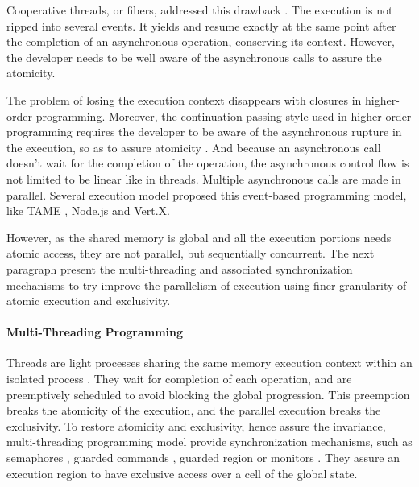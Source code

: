 Cooperative threads, or fibers, addressed this drawback \cite{Adya2002,Behren2003a}.
The execution is not ripped into several events.
It yields and resume exactly at the same point after the completion of an asynchronous operation, conserving its context.
However, the developer needs to be well aware of the asynchronous calls to assure the atomicity.

The problem of losing the execution context disappears with closures in higher-order programming.
Moreover, the continuation passing style used in higher-order programming requires the developer to be aware of the asynchronous rupture in the execution, so as to assure atomicity \cite{Sussman1998}.
And because an asynchronous call doesn't wait for the completion of the operation, the asynchronous control flow is not limited to be linear like in threads.
Multiple asynchronous calls are made in parallel.
Several execution model proposed this event-based programming model, like TAME \cite{Krohn2007}, Node.js and Vert.X.

However, as the shared memory is global and all the execution portions needs atomic access, they are not parallel, but sequentially concurrent.
The next paragraph present the multi-threading and associated synchronization mechanisms to try improve the parallelism of execution using finer granularity of atomic execution and exclusivity.

\paragraph{Multi-Threading Programming}

Threads are light processes sharing the same memory execution context within an isolated process \cite{Dijkstra1968}.
They wait for completion of each operation, and are preemptively scheduled to avoid blocking the global progression.
This preemption breaks the atomicity of the execution, and the parallel execution breaks the exclusivity.
To restore atomicity and exclusivity, hence assure the invariance, multi-threading programming model provide synchronization mechanisms, such as semaphores \cite{Dijkstra}, guarded commands \cite{Dijkstra1975}, guarded region \cite{Hansen1978a} or monitors \cite{Hoare1974}.
They assure an execution region to have exclusive access over a cell of the global state.

